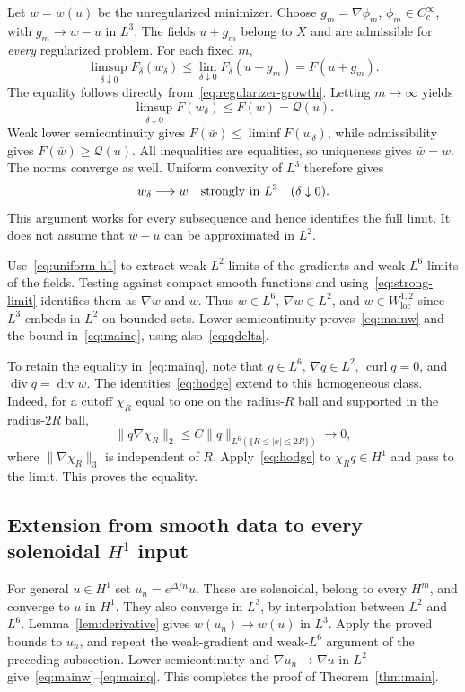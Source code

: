 \documentclass[11pt,a4paper]{article}
\theoremstyle{definition}
\newcommand{\Q}{\mathcal Q}
\DeclareMathOperator{\diver}{div}
\DeclareMathOperator{\curl}{curl}
\begin{document}
Let $w=w(u)$ be the unregularized minimizer. Choose $g_m=\nabla\phi_m$, $\phi_m\in C_c^\infty$, with $g_m\to w-u$ in $L^3$. The fields $u+g_m$ belong to $X$ and are admissible for \emph{every} regularized problem. For each fixed $m$,
\[
 \limsup_{\delta\downarrow0}F_\delta(w_\delta)
 \le\lim_{\delta\downarrow0}F_\delta(u+g_m)=F(u+g_m).
\]
The equality follows directly from~\eqref{eq:regularizer-growth}. Letting $m\to\infty$ yields
\[
 \limsup_{\delta\downarrow0}F(w_\delta)\le F(w)=\Q(u).
\]
Weak lower semicontinuity gives $F(\bar w)\le\liminf F(w_\delta)$, while admissibility gives $F(\bar w)\ge\Q(u)$. All inequalities are equalities, so uniqueness gives $\bar w=w$. The norms converge as well. Uniform convexity of $L^3$ therefore gives
\begin{equation}\label{eq:strong-limit}
 w_\delta\longrightarrow w\quad\hbox{strongly in }L^3\quad(\delta\downarrow0).
\end{equation}
This argument works for every subsequence and hence identifies the full limit. It does not assume that $w-u$ can be approximated in $L^2$.

Use~\eqref{eq:uniform-h1} to extract weak $L^2$ limits of the gradients and weak $L^6$ limits of the fields. Testing against compact smooth functions and using~\eqref{eq:strong-limit} identifies them as $\nabla w$ and $w$. Thus $w\in L^6$, $\nabla w\in L^2$, and $w\in W^{1,2}_{\mathrm{loc}}$ since $L^3$ embeds in $L^2$ on bounded sets. Lower semicontinuity proves~\eqref{eq:mainw} and the bound in~\eqref{eq:mainq}, using also~\eqref{eq:qdelta}.

To retain the equality in~\eqref{eq:mainq}, note that $q\in L^6$, $\nabla q\in L^2$, $\curl q=0$, and $\diver q=\diver w$. The identities~\eqref{eq:hodge} extend to this homogeneous class. Indeed, for a cutoff $\chi_R$ equal to one on the radius-$R$ ball and supported in the radius-$2R$ ball,
\[
 \|q\nabla\chi_R\|_2
 \le C\|q\|_{L^6(\{R\le|x|\le2R\})}\longrightarrow0,
\]
where $\|\nabla\chi_R\|_3$ is independent of $R$. Apply~\eqref{eq:hodge} to $\chi_Rq\in H^1$ and pass to the limit. This proves the equality.

\subsection{Extension from smooth data to every solenoidal \texorpdfstring{$H^1$}{H1} input}
For general $u\in H^1$ set $u_n=e^{\Delta/n}u$. These are solenoidal, belong to every $H^m$, and converge to $u$ in $H^1$. They also converge in $L^3$, by interpolation between $L^2$ and $L^6$. Lemma~\ref{lem:derivative} gives $w(u_n)\to w(u)$ in $L^3$. Apply the proved bounds to $u_n$, and repeat the weak-gradient and weak-$L^6$ argument of the preceding subsection. Lower semicontinuity and $\nabla u_n\to\nabla u$ in $L^2$ give~\eqref{eq:mainw}--\eqref{eq:mainq}. This completes the proof of Theorem~\ref{thm:main}.
\end{document}
